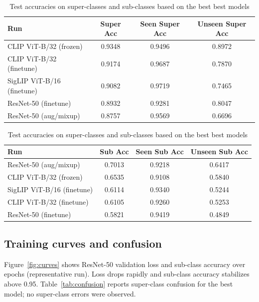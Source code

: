 \documentclass{article}
\begin{document}
\begin{table}[H]
\centering

\begin{tabular}{lccc}
\toprule
Run & Super Acc & Seen Super Acc & Unseen Super Acc \\
\midrule
CLIP ViT-B/32 (frozen) & 0.9348 & 0.9496 & 0.8972 \\ 
CLIP ViT-B/32 (finetune) & 0.9174 & 0.9687 & 0.7870 \\
SigLIP ViT-B/16 (finetune) & 0.9082 & 0.9719 & 0.7465 \\
ResNet-50 (finetune) & 0.8932 & 0.9281 & 0.8047 \\
ResNet-50 (aug/mixup) & 0.8757 & 0.9569 & 0.6696 \\
\bottomrule
\end{tabular}

\vspace{0.6em}

\begin{tabular}{lccc}
\toprule
Run & Sub Acc & Seen Sub Acc & Unseen Sub Acc \\
\midrule
ResNet-50 (aug/mixup) & 0.7013 & 0.9218 & 0.6417 \\
CLIP ViT-B/32 (frozen) & 0.6535 & 0.9108 & 0.5840 \\ 
SigLIP ViT-B/16 (finetune) & 0.6114 & 0.9340 & 0.5244 \\
CLIP ViT-B/32 (finetune) & 0.6105 & 0.9260 & 0.5253 \\
ResNet-50 (finetune) & 0.5821 & 0.9419 & 0.4849 \\
\bottomrule
\end{tabular}

\caption{Test accuracies on super-classes and sub-classes based on the best best models}
\end{table}

\subsection{Training curves and confusion}
Figure~\ref{fig:curves} shows ResNet-50 validation loss and sub-class accuracy over epochs (representative run). Loss drops rapidly and sub-class accuracy stabilizes above 0.95. Table~\ref{tab:confusion} reports super-class confusion for the best model; no super-class errors were observed.
\end{document}
